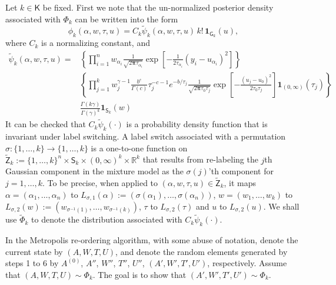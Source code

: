 \documentclass[12pt]{article}
\newcommand{\Z}{\mathsf{Z}}
\newcommand{\ind}{\mathbf{1}}
\begin{document}
Let $k \in \mathsf{K}$ be fixed.
First we note that the un-normalized posterior density associated with $\Phi_k$ can be written into the form
\[
\phi_k(\alpha, w, \tau, u) = C_k \tilde{\psi}_k(\alpha, w, \tau, u) \, k! \, \ind_{\mathsf{G}_k}(u),
\]
where $C_k$ is a normalizing constant, and 
\[
\begin{aligned}
	\tilde{\psi}_k(\alpha, w, \tau, u) =& \left\{ \prod_{i=1}^n w_{\alpha_i} \frac{1}{\sqrt{2\bm{\pi} \tau_{\alpha_i} } } \exp\left[ - \frac{1}{2 \tau_{\alpha_i}} (y_i - u_{\alpha_i})^2 \right] \right\} \\
	& \left\{ \prod_{j=1}^k w_j^{\gamma - 1} \frac{b^c}{\Gamma(c)} \tau_j^{-c - 1} e^{-b/\tau_j} \frac{1}{\sqrt{2 \bm{\pi} \tau_0 \tau_j}} \exp\left[ - \frac{(u_j-u_0)^2}{2\tau_0 \tau_j}  \right] \ind_{(0,\infty)}(\tau_j) \right\} \\
	&  \frac{\Gamma(k\gamma)}{\Gamma(\gamma)^k} \ind_{\mathsf{S}_k}(w)
\end{aligned}
\]
It can be checked that $C_k \tilde{\psi}_k(\cdot)$ is a probability density function that is invariant under label switching.
A label switch associated with a permutation $\sigma: \{1,\dots,k\} \to \{1,\dots,k\}$ is a one-to-one function on $\tilde{\Z}_k := \{1,\dots,k\}^n \times \mathsf{S}_k \times (0,\infty)^k \times \mathbb{R}^k$ that results from re-labeling the $j$th Gaussian component in the mixture model as the $\sigma(j)$'th component for $j = 1,\dots,k$.
To be precise, when applied to $(\alpha, w, \tau, u) \in \tilde{\Z}_k$, it maps $\alpha = (\alpha_1, \dots, \alpha_n)$ to $L_{\sigma,1} (\alpha) := (\sigma(\alpha_1), \dots, \sigma(\alpha_n))$, $w = (w_1, \dots, w_k)$ to $L_{\sigma,2}(w) := (w_{\sigma^{-1}(1)}, \dots, w_{\sigma^{-1}(k)})$, $\tau$ to $L_{\sigma,2}(\tau)$ and $u$ to $L_{\sigma,2}(u)$.
We shall use $\tilde{\Phi}_k$ to denote the distribution associated with $C_k \tilde{\psi}_k(\cdot)$.

In the Metropolis re-ordering algorithm, with some abuse of notation, denote the current state by $(A,W,T,U)$, and denote the random elements generated by steps 1 to 6 by $A^{(0)}$, $A''$, $W''$, $T''$, $U''$, $(A',W',T',U')$, respectively.
Assume that $(A,W,T,U) \sim \Phi_k$.
The goal is to show that $(A',W',T',U') \sim \Phi_k$.
\end{document}
